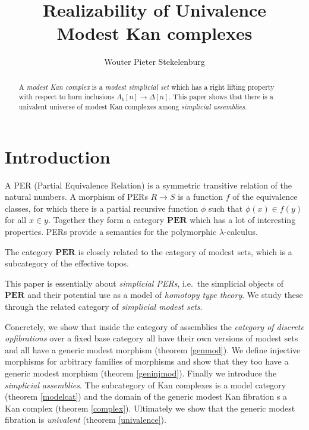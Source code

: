 \documentclass{amsart}
\title{Realizability of Univalence\\
Modest Kan complexes}
\author[W. P. Stekelenburg]{Wouter Pieter Stekelenburg}
\theoremstyle{plain}
\theoremstyle{definition}
\begin{document}
\begin{abstract}
A \emph{modest Kan complex} is a \emph{modest simplicial set} which has a right lifting property with respect to horn inclusions $\Lambda_k[n] \to \Delta[n]$. This paper shows that there is a univalent universe of modest Kan complexes among \emph{simplicial assemblies}.
\end{abstract}

\maketitle

\newcommand\pers{\mathbf{PER}}
\section{Introduction}
A PER (Partial Equivalence Relation) is a symmetric transitive relation of the natural numbers. A morphism of PERs $R\to S$ is a function $f$ of the equivalence classes, for which there is a partial recursive function $\phi$ such that $\phi(x)\in f(y)$ for all $x\in y$. Together they form a category $\pers$ which has a lot of interesting properties. PERs provide a semantics for the polymorphic $\lambda$-calculus. \cite{MR1099188,MR2074932,MR1003196}%

The category $\pers$ is closely related to the category of modest sets, which is a subcategory of the effective topos. \cite{MR1097022,MR1023803,MR2479466}

This paper is essentially about \emph{simplicial PERs}, i.e.\ the simplicial objects of $\pers$ and their potential use as a model of \emph{homotopy type theory}. We study these through the related category of \emph{simplicial modest sets}. 

Concretely, we show that inside the category of assemblies the \emph{category of discrete opfibrations} over a fixed base category all have their own versions of modest sets and all have a generic modest morphism (theorem \ref{genmod}). We define injective morphisms for arbitrary families of morphisms and show that they too have a generic modest morphism (theorem \ref{geninjmod}). Finally we introduce the \emph{simplicial assemblies}. The subcategory of Kan complexes is a model category (theorem \ref{modelcat}) and the domain of the generic modest Kan fibration s a Kan complex (theorem \ref{complex}). Ultimately we show that the generic modest fibration is \emph{univalent} (theorem \ref{univalence}).
\end{document}
